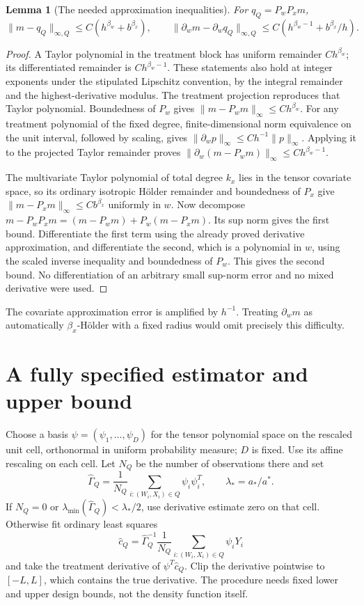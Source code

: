 \documentclass[11pt]{article}
\newtheorem{lemma}[theorem]{Lemma}
\theoremstyle{remark}\newtheorem{remark}[theorem]{Remark}
\begin{document}
\begin{lemma}[The needed approximation inequalities]\label{approx}
For $q_Q=P_wP_xm$,
\[
 \|m-q_Q\|_{\infty,Q}\leq C(h^{\beta_w}+b^{\beta_x}),\qquad
 \|\partial_wm-\partial_wq_Q\|_{\infty,Q}
       \leq C(h^{\beta_w-1}+b^{\beta_x}/h).
\]
\end{lemma}
\begin{proof}
A Taylor polynomial in the treatment block has uniform remainder $Ch^{\beta_w}$; its differentiated remainder is $Ch^{\beta_w-1}$. These statements also hold at integer exponents under the stipulated Lipschitz convention, by the integral remainder and the highest-derivative modulus. The treatment projection reproduces that Taylor polynomial. Boundedness of $P_w$ gives $\|m-P_wm\|_\infty\leq Ch^{\beta_w}$. For any treatment polynomial of the fixed degree, finite-dimensional norm equivalence on the unit interval, followed by scaling, gives
$\|\partial_wp\|_\infty\leq C h^{-1}\|p\|_\infty$.
Applying it to the projected Taylor remainder proves
$\|\partial_w(m-P_wm)\|_\infty\leq Ch^{\beta_w-1}$.

The multivariate Taylor polynomial of total degree $k_x$ lies in the tensor covariate space, so its ordinary isotropic H\"older remainder and boundedness of $P_x$ give
$\|m-P_xm\|_\infty\leq Cb^{\beta_x}$ uniformly in $w$.
Now decompose
$m-P_wP_xm=(m-P_wm)+P_w(m-P_xm)$.
Its sup norm gives the first bound. Differentiate the first term using the already proved derivative approximation, and differentiate the second, which is a polynomial in $w$, using the scaled inverse inequality and boundedness of $P_w$. This gives the second bound. No differentiation of an arbitrary small sup-norm error and no mixed derivative were used.
\end{proof}

The covariate approximation error is amplified by $h^{-1}$. Treating $\partial_wm$ as automatically $\beta_x$-H\"older with a fixed radius would omit precisely this difficulty.

\section{A fully specified estimator and upper bound}
Choose a basis $\psi=(\psi_1,\ldots,\psi_D)$ for the tensor polynomial space on the rescaled unit cell, orthonormal in uniform probability measure; $D$ is fixed. Use its affine rescaling on each cell. Let $N_Q$ be the number of observations there and set
\[
 \widehat\Gamma_Q=\frac1{N_Q}\sum_{i: (W_i,X_i)\in Q}\psi_i\psi_i^T,
 \qquad \lambda_* =a_*/a^*.
\]
If $N_Q=0$ or $\lambda_{\min}(\widehat\Gamma_Q)<\lambda_*/2$, use derivative estimate zero on that cell. Otherwise fit ordinary least squares
\[
 \widehat c_Q=\widehat\Gamma_Q^{-1}
         \frac1{N_Q}\sum_{i:(W_i,X_i)\in Q}\psi_iY_i
\]
and take the treatment derivative of $\psi^T\widehat c_Q$. Clip the derivative pointwise to $[-L,L]$, which contains the true derivative. The procedure needs fixed lower and upper design bounds, not the density function itself.
\end{document}
